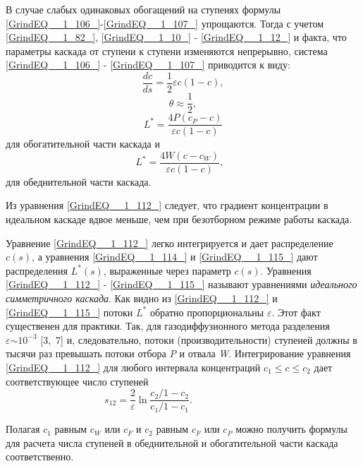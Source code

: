 В случае слабых одинаковых обогащений на ступенях формулы \ref{GrindEQ__1_106_}-\ref{GrindEQ__1_107_} упрощаются. Тогда с учетом \ref{GrindEQ__1_82_}, \ref{GrindEQ__1_10_} - \ref{GrindEQ__1_12_} и факта, что параметры каскада от ступени к ступени изменяются непрерывно, система \ref{GrindEQ__1_106_} - \ref{GrindEQ__1_107_} приводится к виду:
\begin{equation} \label{GrindEQ__1_112_} 
\frac{dc}{ds} =\frac{1}{2} \varepsilon c(1-c), 
\end{equation} 
\begin{equation} \label{GrindEQ__1_113_} 
\theta \approx \frac{1}{2} , 
\end{equation} 
\begin{equation} \label{GrindEQ__1_114_} 
L^{*} =\frac{4P(c_{P} -c)}{\varepsilon c(1-c)}  
\end{equation} 
для обогатительной части каскада и
\begin{equation} \label{GrindEQ__1_115_} 
L^{*} =\frac{4W(c-c_{W} )}{\varepsilon c(1-c)} ,~~~                              
\end{equation} 
для обеднительной части каскада.

Из уравнения \ref{GrindEQ__1_112_} следует, что градиент концентрации в идеальном каскаде вдвое меньше, чем при безотборном режиме работы каскада.

Уравнение \ref{GrindEQ__1_112_} легко интегрируется и дает распределение $c(s)$, а уравнения \ref{GrindEQ__1_114_} и \ref{GrindEQ__1_115_} дают распределения $L^{*} (s)$, выраженные через параметр $c(s)$.  Уравнения \ref{GrindEQ__1_112_} - \ref{GrindEQ__1_115_} называют уравнениями \textit{идеального симметричного каскада}. Как видно из \ref{GrindEQ__1_112_} и \ref{GrindEQ__1_115_} потоки $L^{*} $ обратно пропорциональны $\varepsilon $. Этот факт существенен для практики. Так, для газодиффузионного метода разделения $\varepsilon {\sim 10}^{{-3}} $ [3,~7] и, следовательно, потоки (производительности) ступеней должны в тысячи раз превышать потоки отбора \textit{P} и отвала \textit{W}. Интегрирование уравнения \ref{GrindEQ__1_112_} для любого интервала концентраций $c_{1} \le c\le c_{2} $ дает соответствующее число ступеней
\begin{equation} \label{GrindEQ__1_116_} 
s_{12} =\frac{2}{\varepsilon } \ln \frac{c_{2} /1-c_{2} }{c_{1} /1-c_{1} } . ~~~~~~~~~~~~~~~~~~~~~~~~~~~~ ~~~~ 
\end{equation} 

Полагая $c_{1} $ равным $c_{W} $ или $c_{F} $ и $c_{2} $ равным $c_{F} $ или $c_{P} $ можно получить формулы для расчета числа ступеней в обеднительной и обогатительной части каскада соответственно.

